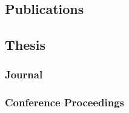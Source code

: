 \subsection*{Publications} 
{}

    \nocite{kulumani2021,
            kulumani2017a,
            kulumani2016d,
            kulumani2016c,
            kulumani2016,
            kulumani2015,
            kulumani2013,
            kulumani2017,
            kulumani2017b,
            kulumani2018,
            kulumani2018a,
            kulumani2018b}
\subsection*{Thesis}
\printbibliography[heading=none, type=thesis, resetnumbers]
\subsubsection*{Journal}
\printbibliography[heading=none, type=article, resetnumbers]
\subsubsection*{Conference Proceedings}
\printbibliography[heading=none, type=inproceedings, resetnumbers]
